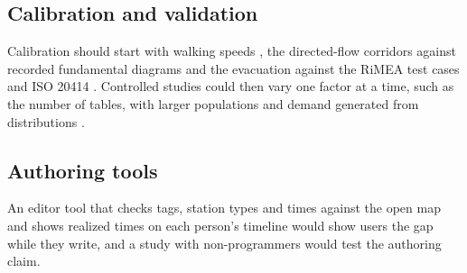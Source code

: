 \subsection{Calibration and validation}\label{sub:future-studies}

Calibration should start with walking speeds \citep{weidmann1993transporttechnik}, the directed-flow corridors against recorded fundamental diagrams \citep{seyfried2005fundamental,zhang2011transitions} and the evacuation against the RiMEA test cases \citep{rimea2025guideline} and ISO 20414 \citep{iso2020evacuation}. Controlled studies could then vary one factor at a time, such as the number of tables, with larger populations and demand generated from distributions \citep{ricks2020generation}.

\subsection{Authoring tools}\label{sub:future-tools}

An editor tool that checks tags, station types and times against the open map and shows realized times on each person's timeline would show users the gap while they write, and a study with non-programmers would test the authoring claim.
